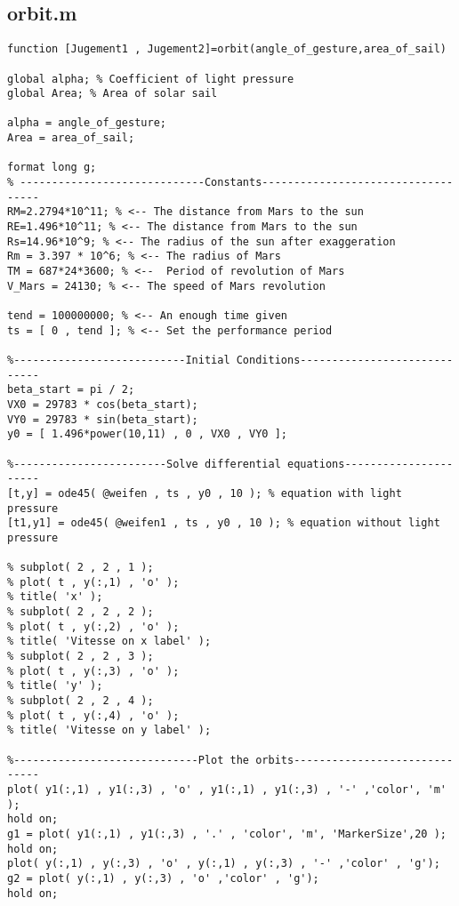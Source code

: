 \documentclass[../Paper.tex]{subfiles}
\begin{document}
\subsection{orbit.m}
\begin{verbatim}
function [Jugement1 , Jugement2]=orbit(angle_of_gesture,area_of_sail)
 
global alpha; % Coefficient of light pressure 
global Area; % Area of solar sail

alpha = angle_of_gesture;
Area = area_of_sail;

format long g;
% -----------------------------Constants-----------------------------------
RM=2.2794*10^11; % <-- The distance from Mars to the sun
RE=1.496*10^11; % <-- The distance from Mars to the sun
Rs=14.96*10^9; % <-- The radius of the sun after exaggeration
Rm = 3.397 * 10^6; % <-- The radius of Mars
TM = 687*24*3600; % <--  Period of revolution of Mars
V_Mars = 24130; % <-- The speed of Mars revolution

tend = 100000000; % <-- An enough time given 
ts = [ 0 , tend ]; % <-- Set the performance period

%---------------------------Initial Conditions-----------------------------
beta_start = pi / 2;
VX0 = 29783 * cos(beta_start);
VY0 = 29783 * sin(beta_start);
y0 = [ 1.496*power(10,11) , 0 , VX0 , VY0 ];

%------------------------Solve differential equations----------------------
[t,y] = ode45( @weifen , ts , y0 , 10 ); % equation with light pressure
[t1,y1] = ode45( @weifen1 , ts , y0 , 10 ); % equation without light pressure

% subplot( 2 , 2 , 1 );
% plot( t , y(:,1) , 'o' );
% title( 'x' );
% subplot( 2 , 2 , 2 );
% plot( t , y(:,2) , 'o' );
% title( 'Vitesse on x label' );
% subplot( 2 , 2 , 3 );
% plot( t , y(:,3) , 'o' );
% title( 'y' );
% subplot( 2 , 2 , 4 );
% plot( t , y(:,4) , 'o' );
% title( 'Vitesse on y label' );

%-----------------------------Plot the orbits------------------------------
plot( y1(:,1) , y1(:,3) , 'o' , y1(:,1) , y1(:,3) , '-' ,'color', 'm' );
hold on;
g1 = plot( y1(:,1) , y1(:,3) , '.' , 'color', 'm', 'MarkerSize',20 );
hold on;
plot( y(:,1) , y(:,3) , 'o' , y(:,1) , y(:,3) , '-' ,'color' , 'g');
g2 = plot( y(:,1) , y(:,3) , 'o' ,'color' , 'g');
hold on;


\end{verbatim}
\end{document}
